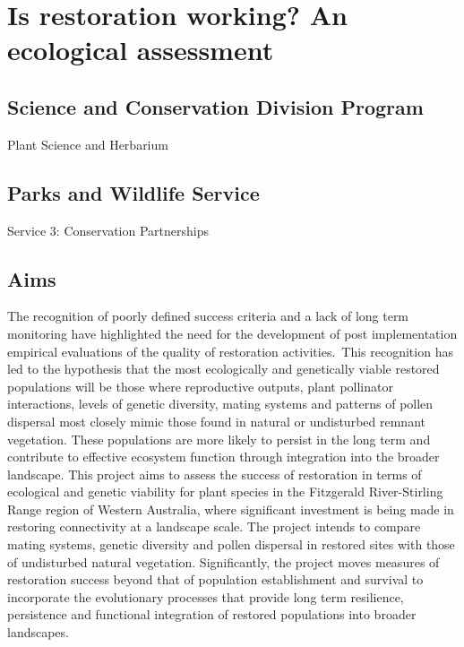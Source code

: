 \documentclass[version=last,
    paper=a4, %
    10pt, %
    usenames,
    dvipsnames,
    oneside, %
    headings=openany, %
    DIV=15 %
]{scrbook}
\begin{document}
\section*{Is restoration working? An ecological assessment
}



\subsection*{Science and Conservation Division Program}

Plant Science and Herbarium




\subsection*{Parks and Wildlife Service}

Service 3: Conservation Partnerships




\subsection*{Aims}

The recognition of poorly defined success criteria and a lack of long
term monitoring have highlighted the need for the development of post
implementation empirical evaluations of the quality of restoration
activities.~This recognition has led to the hypothesis that the most
ecologically and genetically viable restored populations will be those
where reproductive outputs, plant pollinator interactions, levels of
genetic diversity, mating systems and patterns of pollen dispersal most
closely mimic those found in natural or undisturbed remnant vegetation.
These populations are more likely to persist in the long term and
contribute to effective ecosystem function through integration into the
broader landscape. This project aims to assess the success of
restoration in terms of ecological and genetic viability for plant
species in the Fitzgerald River-Stirling Range region of Western
Australia, where significant investment is being made in restoring
connectivity at a landscape scale. The project intends to compare mating
systems, genetic diversity and pollen dispersal in restored sites with
those of undisturbed natural vegetation. Significantly, the project
moves measures of restoration success beyond that of population
establishment and survival to incorporate the evolutionary processes
that provide long term resilience, persistence and functional
integration of restored populations into broader landscapes.
\end{document}
